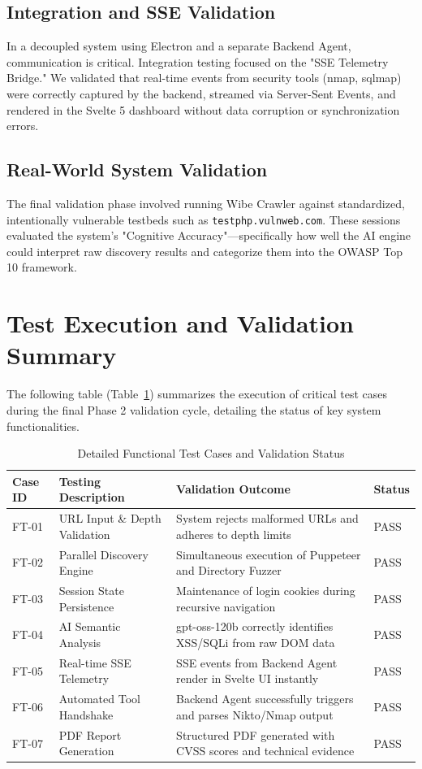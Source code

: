 \documentclass[12pt,oneside,a4paper]{book}
\begin{document}
\subsection{Integration and SSE Validation}
In a decoupled system using Electron and a separate Backend Agent, communication is critical. Integration testing focused on the "SSE Telemetry Bridge." We validated that real-time events from security tools (nmap, sqlmap) were correctly captured by the backend, streamed via Server-Sent Events, and rendered in the Svelte 5 dashboard without data corruption or synchronization errors.

\subsection{Real-World System Validation}
The final validation phase involved running Wibe Crawler against standardized, intentionally vulnerable testbeds such as \texttt{testphp.vulnweb.com}. These sessions evaluated the system's "Cognitive Accuracy"—specifically how well the AI engine could interpret raw discovery results and categorize them into the OWASP Top 10 framework.

\section{Test Execution and Validation Summary}

The following table (Table~\ref{tab:test-execution}) summarizes the execution of critical test cases during the final Phase 2 validation cycle, detailing the status of key system functionalities.

\begin{table}[H]
\centering
\caption{Detailed Functional Test Cases and Validation Status}
\label{tab:test-execution}
\begin{tabularx}{\textwidth}{|l|X|X|l|}
\hline
\textbf{Case ID} & \textbf{Testing Description} & \textbf{Validation Outcome} & \textbf{Status} \\
\hline
FT-01 & URL Input \& Depth Validation & System rejects malformed URLs and adheres to depth limits & PASS \\
\hline
FT-02 & Parallel Discovery Engine & Simultaneous execution of Puppeteer and Directory Fuzzer & PASS \\
\hline
FT-03 & Session State Persistence & Maintenance of login cookies during recursive navigation & PASS \\
\hline
FT-04 & AI Semantic Analysis & gpt-oss-120b correctly identifies XSS/SQLi from raw DOM data & PASS \\
\hline
FT-05 & Real-time SSE Telemetry & SSE events from Backend Agent render in Svelte UI instantly & PASS \\
\hline
FT-06 & Automated Tool Handshake & Backend Agent successfully triggers and parses Nikto/Nmap output & PASS \\
\hline
FT-07 & PDF Report Generation & Structured PDF generated with CVSS scores and technical evidence & PASS \\
\hline
\end{tabularx}
\end{table}
\end{document}
